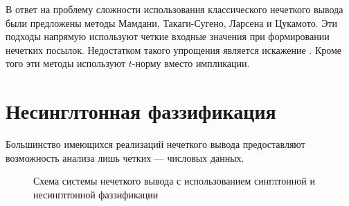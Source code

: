 В ответ на проблему сложности использования классического нечеткого вывода были предложены методы Мамдани, Такаги-Сугено, Ларсена и Цукамото. Эти подходы напрямую используют четкие входные значения при формировании нечетких посылок. Недостатком такого упрощения является искажение . Кроме того эти методы используют $t$-норму вместо импликации.

%
%
%

\section{Несинглтонная фаззификация}

Большинство имеющихся реализаций нечеткого вывода предоставляют возможность анализа лишь четких --- числовых данных.

\begin{figure}[ht]
	\caption{Схема системы нечеткого вывода с использованием синглтонной и несинглтонной фаззификации}
	\label{fig:singleton-vs-nonsingleton}
\end{figure}

